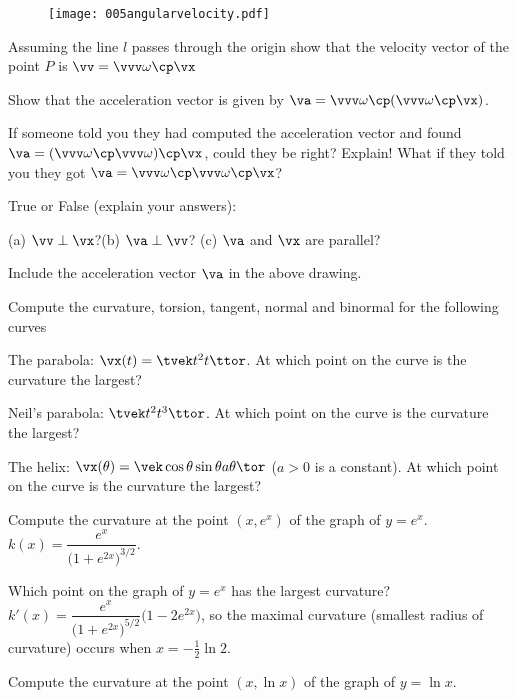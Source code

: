 \begin{figure}[h]
  \begin{center}
    \texttt{[image: 005angularvelocity.pdf]}
  \end{center}
\end{figure}


\subprob Assuming the line $l$ passes through the origin show that the
velocity vector of the point $P$ is $\vv = \vvv\omega \cp \vx$

\subprob Show that the acceleration vector is given by $\va =
\vvv\omega\cp(\vvv\omega\cp\vx)$.

\subprob If someone told you they had computed the acceleration vector
and found $\va =(\vvv\omega\cp\vvv\omega)\cp\vx$, could they be right?
Explain!  What if they told you they got $\va =
\vvv\omega\cp\vvv\omega\cp\vx$?

\subprob True or False (explain your answers):

(a) $\vv\perp \vx$?\qquad (b) $\va\perp \vv$? \qquad (c) $\va$ and
$\vx$ are parallel?

\subprob Include the acceleration vector $\va$ in the above drawing.

\problem Compute the curvature, torsion, tangent, normal and binormal %
for the following curves

\subprob The parabola: $\vx(t) = \tvek t^2 \\ t\ttor$.  At which point
on the curve is the curvature the largest?

\subprob Neil's parabola: $\tvek t^2\\ t^3\ttor$.  At which point on
the curve is the curvature the largest?

\subprob The helix: $\vx(\theta) =\vek\cos \theta \\ \sin \theta\\
a\theta\tor$ ($a>0$ is a constant).  At which point on the curve is
the curvature the largest?

\problem \subprob Compute the curvature at the point $(x, e^x)$ of the %
graph of $y=e^x$.
\answer $k(x) = \dfrac{e^x} %
{\bigl(1+e^{2x}\bigr)^{3/2}}$.
\endanswer

\subprob Which point on the graph of $y=e^x$ has the largest
curvature?
\answer $k'(x) = \dfrac{e^x} {\bigl(1+e^{2x}\bigr)^{5/2}} %
\bigl(1-2e^{2x}\bigr)$, so the maximal curvature (smallest radius of
curvature) occurs when $x=-\frac{1} {2}\ln{2}$.
\endanswer

\problem \subprob Compute the curvature at the point $(x, \ln x)$ of %
the graph of $y=\ln x$.

